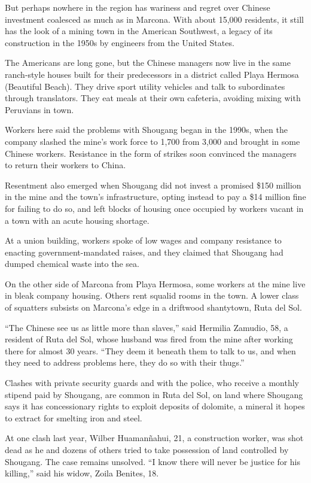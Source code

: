 ﻿\documentclass[12pt]{article}
\begin{document}
But perhaps nowhere in the region has wariness and regret over Chinese investment coalesced as much
as in Marcona. With about 15,000 residents, it still has the look of a mining town in the American
Southwest, a legacy of its construction in the 1950s by engineers from the United States.

The Americans are long gone, but the Chinese managers now live in the same ranch-style houses built
for their predecessors in a district called Playa Hermosa (Beautiful Beach). They drive sport
utility vehicles and talk to subordinates through translators. They eat meals at their own
cafeteria, avoiding mixing with Peruvians in town.

Workers here said the problems with Shougang began in the 1990s, when the company slashed the mine's
work force to 1,700 from 3,000 and brought in some Chinese workers. Resistance in the form of
strikes soon convinced the managers to return their workers to China.

Resentment also emerged when Shougang did not invest a promised \$150 million in the mine and the
town's infrastructure, opting instead to pay a \$14 million fine for failing to do so, and left
blocks of housing once occupied by workers vacant in a town with an acute housing shortage.

At a union building, workers spoke of low wages and company resistance to enacting
government-mandated raises, and they claimed that Shougang had dumped chemical waste into the sea.

On the other side of Marcona from Playa Hermosa, some workers at the mine live in bleak company
housing. Others rent squalid rooms in the town. A lower class of squatters subsists on Marcona's
edge in a driftwood shantytown, Ruta del Sol.

``The Chinese see us as little more than slaves,'' said Hermilia Zamudio, 58, a resident of Ruta del
Sol, whose husband was fired from the mine after working there for almost 30 years. ``They deem it
beneath them to talk to us, and when they need to address problems here, they do so with their
thugs.''

Clashes with private security guards and with the police, who receive a monthly stipend paid by
Shougang, are common in Ruta del Sol, on land where Shougang says it has concessionary rights to
exploit deposits of dolomite, a mineral it hopes to extract for smelting iron and steel.

At one clash last year, Wilber Huaman\~{n}ahui, 21, a construction worker, was shot dead as he and
dozens of others tried to take possession of land controlled by Shougang. The case remains unsolved.
``I know there will never be justice for his killing,'' said his widow, Zoila Benites, 18.
\end{document}
